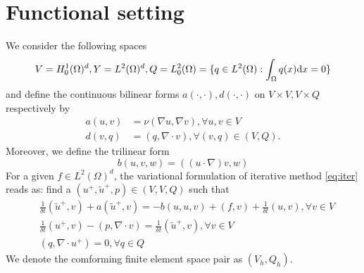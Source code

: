 \section{Functional setting}
We consider the following spaces
\[V=H_0^1(\Omega)^d,Y=L^2(\Omega)^d,Q=L^2_0(\Omega)=\{q\in L^2(\Omega):\int_\Omega q(x)\mathrm{d} x=0\}\]
and define the continuous bilinear forms $a(\cdot,\cdot),d(\cdot,\cdot)$ on $V\times V,V\times Q$ 
respectively by
\[
  \begin{split}
    a(u,v)&=\nu(\nabla u,\nabla v),\forall u,v\in V\\
    d(v,q)&=(q,\nabla\cdot v),\forall (v,q)\in(V,Q).
  \end{split}
  \]
Moreover, we define the trilinear form
\[b(u,v,w)=((u\cdot\nabla)v,w)\]
For a given $f\in L^2(\Omega)^d$, the variational formulation of iterative method \eqref{eq:iter} reads as: 
find a $(u^+,\tilde{u}^+,p)\in(V,V,Q)$ such that 
\begin{equation}\label{eq:discrete-variational}
  \begin{split}
    & \frac{1}{\delta t}(\tilde{u}^+,v)+a(\tilde{u}^+,v)=-b(u,u,v)+(f,v)+\frac{1}{\delta t}(u,v), \forall v\in V \\
    & \frac{1}{\delta t}(u^+,v)-(p,\nabla\cdot v)=\frac{1}{\delta t}(\tilde{u}^+,v), \forall v\in V\\ 
    & (q,\nabla\cdot u^+) = 0, \forall q\in Q
  \end{split}
\end{equation}
We denote the comforming finite element space pair as $(V_h,Q_h)$.
